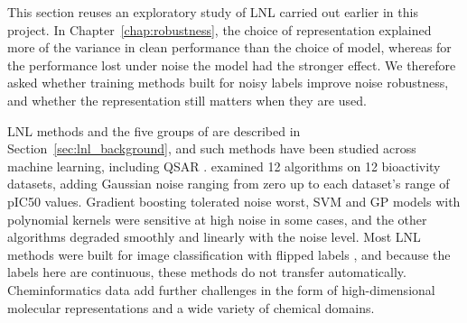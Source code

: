 %
%
This section reuses an exploratory study of LNL carried out earlier in this project. In Chapter~\ref{chap:robustness}, the choice of representation explained more of the variance in clean performance than the choice of model, whereas for the performance lost under noise the model had the stronger effect. We therefore asked whether training methods built for noisy labels improve noise robustness, and whether the representation still matters when they are used.

LNL methods and the five groups of \citet{Song2022} are described in Section~\ref{sec:lnl_background}, and such methods have been studied across machine learning, including QSAR \citep{Cortes2015}. \citet{Cortes2015} examined 12 algorithms on 12 bioactivity datasets, adding Gaussian noise ranging from zero up to each dataset's range of pIC50 values. Gradient boosting tolerated noise worst, SVM and GP models with polynomial kernels were sensitive at high noise in some cases, and the other algorithms degraded smoothly and linearly with the noise level. Most LNL methods were built for image classification with flipped labels \citep{Song2022}, and because the labels here are continuous, these methods do not transfer automatically. Cheminformatics data add further challenges in the form of high-dimensional molecular representations and a wide variety of chemical domains.

